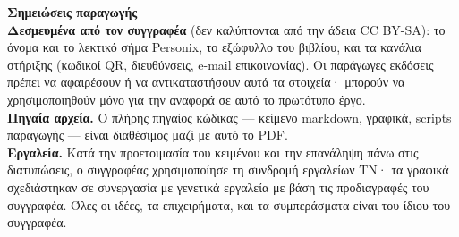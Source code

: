 \clearpage
\thispagestyle{empty}
\begin{flushleft}\small\sffamily
\textbf{Σημειώσεις παραγωγής}\\[1.2em]

\textbf{Δεσμευμένα από τον συγγραφέα} (δεν καλύπτονται από την άδεια CC BY-SA): το
όνομα και το λεκτικό σήμα Personix, το εξώφυλλο του βιβλίου, και τα κανάλια στήριξης
(κωδικοί QR, διευθύνσεις, e-mail επικοινωνίας). Οι παράγωγες εκδόσεις πρέπει να
αφαιρέσουν ή να αντικαταστήσουν αυτά τα στοιχεία· μπορούν να χρησιμοποιηθούν μόνο
για την αναφορά σε αυτό το πρωτότυπο έργο.\\[1.2em]

\textbf{Πηγαία αρχεία.} Ο πλήρης πηγαίος κώδικας --- κείμενο markdown, γραφικά,
scripts παραγωγής --- είναι διαθέσιμος μαζί με αυτό το PDF.\\[1.2em]

\textbf{Εργαλεία.} Κατά την προετοιμασία του κειμένου και την επανάληψη πάνω στις
διατυπώσεις, ο συγγραφέας χρησιμοποίησε τη συνδρομή εργαλείων ΤΝ· τα γραφικά
σχεδιάστηκαν σε συνεργασία με γενετικά εργαλεία με βάση τις προδιαγραφές του
συγγραφέα. Όλες οι ιδέες, τα επιχειρήματα, και τα συμπεράσματα είναι του ίδιου
του συγγραφέα.
\end{flushleft}
\clearpage
